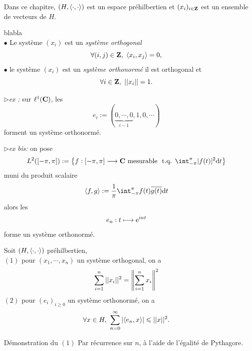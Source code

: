 \documentclass[a4paper,11pt, twoside]{article}
\begin{document}


Dans ce chapitre, $(H,\left\langle \cdot,\cdot \right\rangle)$ est un espace préhilbertien et $(x_i)_{i\in\mathbf Z}$ est un ensemble de vecteurs de $H$.



\begin{Def}{\color{white} blabla}\\
  $\bullet$ Le système $(x_i)$ est un \emph{système orthogonal} \ssi 
  $$\forall (i,j)\in\mathbf Z,\ \left\langle x_i,x_j \right\rangle=0,$$
  $\bullet$ le système $(x_i)$ est un \emph{système orthonormé} \ssi il est orthogonal et 
  $$\forall i\in\mathbf Z,\ ||x_i||=1.$$
\end{Def}


$\triangleright$\emph{ex : }sur $\ell^1(\mathbf C)$, les 
$$e_i:=(\underbrace{0,\cdots,0}_{i-1},1,0,\cdots)$$
forment un système orthonormé.


$\triangleright$\emph{ex bis: }on pose 
$$L^2([-\pi,\pi]):=\ens{f:[-\pi,\pi]\longrightarrow\C\text{ mesurable }\tq\dstyle\int_{-\pi}^\pi |f(t)|^2\dt}$$
muni du produit scalaire 
$$\ps{f,g}:=\frac{1}{\pi}\int_{-\pi}^\pi f(t)\overline{g(t)}\dt$$
alors les 
$$e_n:t\longmapsto \mathrm{e}^{int}$$
forme un système orthonormé.



\begin{prop}
  Soit $(H,\left\langle \cdot,\cdot \right\rangle)$ préhilbertien,\\
  $(\mathit 1)$ pour $(x_1,\cdots,x_n)$ un système orthogonal, on a 
  $$\sum_{i=1}^n||x_i||^2=\left\lVert\sum_{i=1}^n x_i\right\rVert^2$$
  $(\mathit 2)$ pour $(e_i)_{i\geqslant 0}$ un système orthonormé, on a 
  $$\forall x\in H,\ \sum_{n=0}^\infty\left| \left\langle e_n,x \right\rangle\right|\leqslant ||x||^2.$$
\end{prop}


\begin{ProofC}{Démonstration du $(\mathit 1)$}
  Par récurrence sur $n$, à l'aide de l'égalité de Pythagore.
\end{ProofC}
\end{document}

